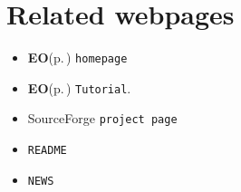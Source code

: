 \section{Related webpages}\label{webpages}
\begin{itemize}
\item {\bf EO}{\rm (p.\,\pageref{class_e_o})} {\tt homepage}\item {\bf EO}{\rm (p.\,\pageref{class_e_o})} {\tt Tutorial}.\item Source\-Forge {\tt project page}\item {\tt README}\item {\tt NEWS} \end{itemize}
